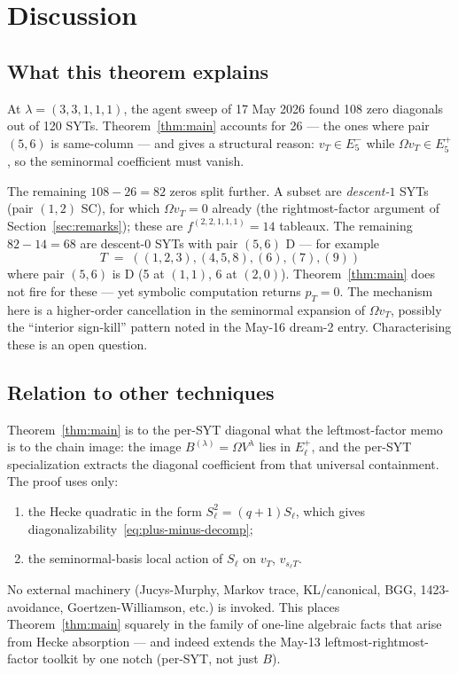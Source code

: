 \documentclass[11pt]{article}
\theoremstyle{definition}
\newcommand{\Vlam}{V^\lambda}
\newcommand{\Om}{\Omega}
\newcommand{\Eplus}{E^+}
\newcommand{\Eminus}{E^-}
\newcommand{\pT}{p_T}
\begin{document}
\section{Discussion}\label{sec:discussion}

\subsection{What this theorem explains}

At $\lambda = (3,3,1,1,1)$, the agent sweep of 17 May 2026 found 108
zero diagonals out of 120 SYTs. Theorem~\ref{thm:main} accounts for
26 — the ones where pair $(5,6)$ is same-column — and gives a structural
reason: $v_T \in \Eminus_5$ while $\Om v_T \in \Eplus_5$, so the
seminormal coefficient must vanish.

The remaining $108 - 26 = 82$ zeros split further. A subset are
\emph{descent-$1$} SYTs (pair $(1,2)$ SC), for which $\Om v_T = 0$
already (the rightmost-factor argument of Section~\ref{sec:remarks});
these are $f^{(2,2,1,1,1)} = 14$ tableaux. The remaining
$82 - 14 = 68$ are descent-$0$ SYTs with pair $(5,6)$ D — for example
\[
   T \;=\; ((1,2,3),(4,5,8),(6),(7),(9))
\]
where pair $(5,6)$ is D (5 at $(1,1)$, 6 at $(2,0)$). Theorem~\ref{thm:main}
does not fire for these — yet symbolic computation returns $\pT = 0$.
The mechanism here is a higher-order cancellation in the seminormal
expansion of $\Om v_T$, possibly the ``interior sign-kill'' pattern noted
in the May-16 dream-2 entry. Characterising these is an open question.

\subsection{Relation to other techniques}

Theorem~\ref{thm:main} is to the per-SYT diagonal what the leftmost-factor
memo~\cite[\texttt{leftmost-rightmost-factor-technique}]{memory} is to
the chain image: the image $B^{(\lambda)} = \Om \Vlam$ lies in $\Eplus_\ell$,
and the per-SYT specialization extracts the diagonal coefficient from
that universal containment. The proof uses only:
\begin{enumerate}[label=(\roman*),topsep=0.2em,itemsep=0.1em]
\item the Hecke quadratic in the form $S_\ell^2 = (q+1) S_\ell$, which
   gives diagonalizability~\eqref{eq:plus-minus-decomp};
\item the seminormal-basis local action of $S_\ell$ on $v_T$, $v_{s_\ell T}$.
\end{enumerate}
No external machinery (Jucys-Murphy, Markov trace, KL/canonical, BGG,
1423-avoidance, Goertzen-Williamson, etc.) is invoked. This places
Theorem~\ref{thm:main} squarely in the family of one-line algebraic facts
that arise from Hecke absorption — and indeed extends the May-13
leftmost-rightmost-factor toolkit by one notch (per-SYT, not just $B$).
\end{document}
